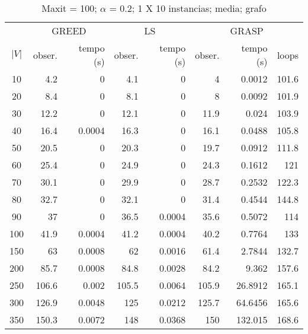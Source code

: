 \documentclass[]{article}
\begin{document}
\begin {table}[h]
\centering
\caption{Maxit = 100; $\alpha$ = 0.2; 1 X 10 instancias; media; grafo}
\begin{small}
	\begin{tabular}{|c|r|r|r|r|r|r|r|}
		\hline
		& \multicolumn{2}{c|}{GREED} & \multicolumn{2}{c|}{LS} & \multicolumn{3}{c|}{GRASP} \\ 
		\cline{2-8}
		$|V|$   &  obser. & tempo (s)  & obser. & tempo (s) & obser. & tempo (s) & loops\\ 
		\hline
		10 & 4.2 & 0 & 4.1 & 0 & 4 & 0.0012 & 101.6 \\ 
		20 & 8.4 & 0 & 8.1 & 0 & 8 & 0.0092 & 101.9 \\ 
		30 & 12.2 & 0 & 12.1 & 0 & 11.9 & 0.024 & 103.9 \\ 
		40 & 16.4 & 0.0004 & 16.3 & 0 & 16.1 & 0.0488 & 105.8 \\ 
		50 & 20.5 & 0 & 20.3 & 0 & 19.7 & 0.0912 & 111.8 \\ 
		60 & 25.4 & 0 & 24.9 & 0 & 24.3 & 0.1612 & 121 \\ 
		70 & 30.1 & 0 & 29.9 & 0 & 28.7 & 0.2532 & 122.3 \\ 
		80 & 32.7 & 0 & 32.1 & 0 & 31.4 & 0.4544 & 144.8 \\ 
		90 & 37 & 0 & 36.5 & 0.0004 & 35.6 & 0.5072 & 114 \\ 
		100 & 41.9 & 0.0004 & 41.2 & 0.0004 & 40.2 & 0.7764 & 133 \\ 
		150 & 63 & 0.0008 & 62 & 0.0016 & 61.4 & 2.7844 & 132.7 \\ 
		200 & 85.7 & 0.0008 & 84.8 & 0.0028 & 84.2 & 9.362 & 157.6 \\ 
		250 & 106.6 & 0.002 & 105.5 & 0.0064 & 105.9 & 26.8912 & 165.1 \\ 
		300 & 126.9 & 0.0048 & 125 & 0.0212 & 125.7 & 64.6456 & 165.6 \\ 
		350 & 150.3 & 0.0072 & 148 & 0.0368 & 150 & 132.015 & 168.6 \\ 
		\hline
	\end{tabular} \label{}
\end{small}
\end{table}
\end{document}
